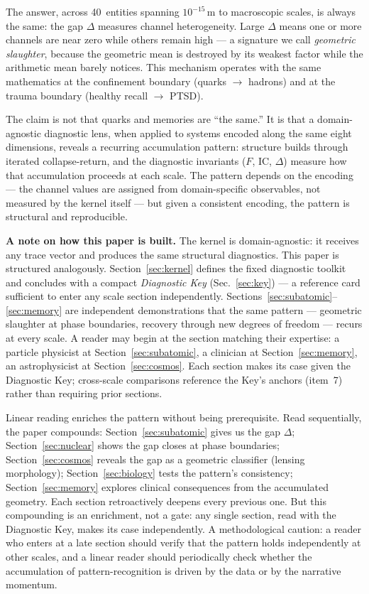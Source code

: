 \documentclass[
  aps,
  prd,
  twocolumn,
  superscriptaddress,
  nofootinbib,
  floatfix
]{revtex4-2}
\newcommand{\IC}{\mathrm{IC}}
\begin{document}
The answer, across 40~entities spanning $10^{-15}$\,m to
macroscopic scales, is always the same: the gap $\Delta$
measures channel heterogeneity.  Large $\Delta$ means one or
more channels are near zero while others remain high ---
a signature we call \emph{geometric slaughter}, because the
geometric mean is destroyed by its weakest factor while the
arithmetic mean barely notices.  This mechanism operates with
the same mathematics at the confinement boundary (quarks
$\to$ hadrons) and at the trauma boundary (healthy recall
$\to$ PTSD).

The claim is not that quarks and memories are ``the same.''
It is that a domain-agnostic diagnostic lens, when applied to
systems encoded along the same eight dimensions, reveals a
recurring accumulation pattern: structure builds through
iterated collapse-return, and the diagnostic invariants
($F$, $\IC$, $\Delta$) measure how that accumulation
proceeds at each scale.  The pattern depends on the encoding
--- the channel values are assigned from domain-specific
observables, not measured by the kernel itself --- but
given a consistent encoding, the pattern is structural
and reproducible.

\textbf{A note on how this paper is built.}
The kernel is domain-agnostic: it receives any trace vector
and produces the same structural diagnostics.  This paper is
structured analogously.  Section~\ref{sec:kernel} defines
the fixed diagnostic toolkit and concludes with a compact
\emph{Diagnostic Key} (Sec.~\ref{sec:key}) --- a reference
card sufficient to enter any scale section independently.
Sections~\ref{sec:subatomic}--\ref{sec:memory} are
independent demonstrations that the same pattern ---
geometric slaughter at phase boundaries, recovery through
new degrees of freedom --- recurs at every scale.  A reader
may begin at the section matching their expertise: a
particle physicist at Section~\ref{sec:subatomic}, a
clinician at Section~\ref{sec:memory}, an astrophysicist at
Section~\ref{sec:cosmos}.  Each section makes its case
given the Diagnostic Key; cross-scale comparisons reference
the Key's anchors (item~7) rather than requiring prior
sections.

Linear reading enriches the pattern without being
prerequisite.  Read sequentially, the paper compounds:
Section~\ref{sec:subatomic} gives us the gap $\Delta$;
Section~\ref{sec:nuclear} shows the gap closes at phase
boundaries; Section~\ref{sec:cosmos} reveals the gap as a
geometric classifier (lensing morphology);
Section~\ref{sec:biology} tests the pattern's consistency;
Section~\ref{sec:memory} explores clinical consequences from
the accumulated geometry.  Each section retroactively
deepens every previous one.  But this compounding is an
enrichment, not a gate: any single section, read with the
Diagnostic Key, makes its case independently.
A methodological caution: a reader who enters at a late
section should verify that the pattern holds independently
at other scales, and a linear reader should periodically
check whether the accumulation of pattern-recognition is
driven by the data or by the narrative momentum.
\end{document}
